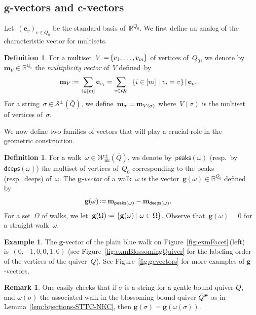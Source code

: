 \documentclass{amsart}
\theoremstyle{definition}
\newtheorem{definition}[theorem]{Definition}
\newtheorem{example}[theorem]{Example}
\newtheorem{remark}[theorem]{Remark}
\newcommand{\R}{\mathbb{R}} %
\renewcommand{\b}[1]{\mathbf{#1}} %
\newcommand{\set}[2]{\left\{ #1 \;\middle|\; #2 \right\}} %
\newcommand{\eqdef}{\mbox{\,\raisebox{0.2ex}{\scriptsize\ensuremath{\mathrm:}}\ensuremath{=}\,}} %
\newcommand{\fref}[1]{Figure~\ref{#1}} %
\newcommand{\darkblue}{\color{darkblue}} %
\newcommand{\defn}[1]{\textsl{\darkblue #1}} %
\newcommand{\blossom}{^\text{\ding{96}}} %
\newcommand{\strings}{\mathcal{S}} %
\newcommand{\NKWalks}{\mathcal{W}_\mathrm{nk}} %
\newcommand{\peaks}[1]{\mathsf{peaks}(#1)} %
\newcommand{\deeps}[1]{\mathsf{deeps}(#1)} %
\newcommand{\gvector}[1]{\mathbf{g}(#1)} %
\newcommand{\gvectors}[1]{\mathbf{g}(#1)} %
\newcommand{\multiplicityVector}{\b{m}} %
\begin{document}
\subsection{$\b{g}$-vectors and $\b{c}$-vectors}
\label{subsec:gcvectors}

Let~$(\b{e}_v)_{v \in Q_0}$ be the standard basis of~$\R^{Q_0}$.
We first define an analog of the characteristic vector for multisets.

\begin{definition}
For a multiset~$V \eqdef \{v_1, \dots, v_m\}$ of vertices of~$Q_0$, we denote by~$\multiplicityVector_V \in \R^{Q_0}$ the \defn{multiplicity vector} of~$V$ defined~by
\[
\multiplicityVector_V \eqdef \sum_{i \in [m]} \b{e}_{v_i} = \sum_{v \in Q_0} |\set{i \in [m]}{v_i = v}| \, \b{e}_v.
\]
For a string~$\sigma \in \strings^\pm(\bar Q)$, we define~$\multiplicityVector_\sigma \eqdef \multiplicityVector_{V(\sigma)}$ where~$V(\sigma)$ is the multiset of vertices of~$\sigma$. 
\end{definition}

We now define two families of vectors that will play a crucial role in the geometric construction.

\begin{definition}\label{def: g-vectors for walks}
For a walk~$\omega \in \NKWalks^\pm(\bar Q)$, we denote by~$\peaks{\omega}$ (resp.~by~$\deeps{\omega}$) the multiset of vertices of~$Q_0$ corresponding to the peaks (resp.~deeps) of~$\omega$.
The \defn{$\b{g}$-vector} of a walk~$\omega$ is the vector~${\gvector{\omega} \in \R^{Q_0}}$ defined by
\[
\gvector{\omega} \eqdef \multiplicityVector_{\peaks{\omega}} - \multiplicityVector_{\deeps{\omega}}.
\]
For a set~$\Omega$ of walks, we let~$\gvectors{\Omega} \eqdef \set{\gvector{\omega}}{\omega \in \Omega}$.
Observe that~$\gvector{\omega} = 0$ for a straight walk~$\omega$.
\end{definition}

\begin{example}
The $\b{g}$-vector of the plain blue walk on \fref{fig:exmFacet}\,(left) is~$(0,-1,0,0,1,0)$ (see \fref{fig:exmBlossomingQuiver} for the labeling order of the vertices of the quiver~$Q$).
See \fref{fig:gcvectors} for more examples of $\b{g}$-vectors.
\end{example}

\begin{remark}\label{rem: g-vectors coincide}
One easily checks that if $\sigma$ is a string for a gentle bound quiver $\bar Q$, and $\omega(\sigma)$ the associated walk in the blossoming bound quiver $\bar Q\blossom$ as in Lemma~\ref{lem:bijections-STTC-NKC}, then $\gvector{\sigma}=\gvector{\omega(\sigma)}$.
\end{remark}
\end{document}
